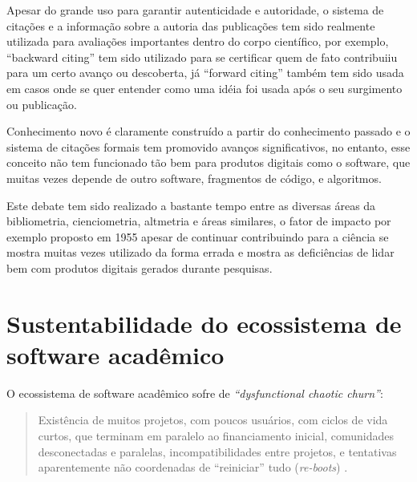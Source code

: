 Apesar do grande uso para garantir autenticidade e autoridade, o sistema de
citações e a informação sobre a autoria das publicações tem sido realmente
utilizada para avaliações importantes dentro do corpo científico, por exemplo,
``backward citing'' tem sido utilizado para se certificar quem de fato
contribuiiu para um certo avanço ou descoberta, já ``forward citing'' também
tem sido usada em casos onde se quer entender como uma idéia foi usada após o
seu surgimento ou publicação.


Conhecimento novo é claramente construído a partir do conhecimento passado e o
sistema de citações formais tem promovido avanços significativos, no entanto,
esse conceito não tem funcionado tão bem para produtos digitais como o
software, que muitas vezes depende de outro software, fragmentos de código, e
algoritmos.

Este debate tem sido realizado a bastante tempo entre as diversas áreas da
bibliometria, cienciometria, altmetria e áreas similares, o fator de impacto
por exemplo proposto em 1955 apesar de continuar contribuindo para a ciência se
mostra muitas vezes utilizado da forma errada e mostra as deficiências de lidar
bem com produtos digitais gerados durante pesquisas.

\section{Sustentabilidade do ecossistema de software acadêmico}



O ecossistema de software acadêmico sofre de {\it ``dysfunctional chaotic
churn''}:

\begin{quote}
Existência de muitos projetos, com poucos usuários, com
ciclos de vida curtos, que terminam em paralelo ao financiamento inicial,
comunidades desconectadas e paralelas, incompatibilidades entre projetos, e
tentativas aparentemente não coordenadas de ``reiniciar'' tudo ({\it re-boots})
\cite{howison2015understanding}.
\end{quote}

